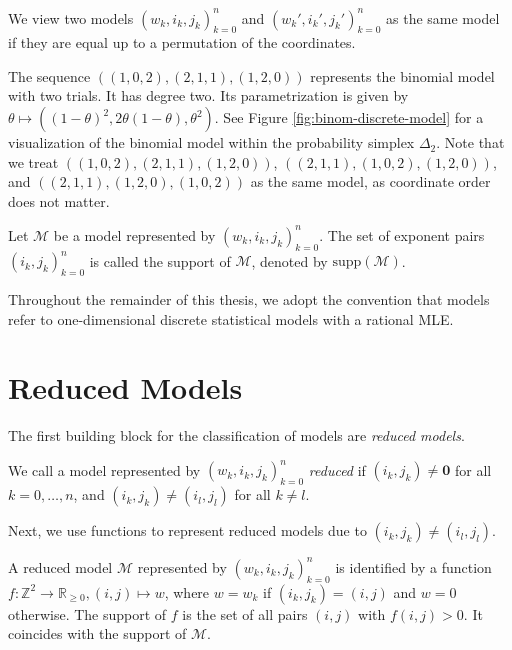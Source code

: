 \begin{remark}\label{rem:equivalent-models}
    We view two models \( (w_k,i_k,j_k)_{k=0}^n \) and \( (w_k',i_k',j_k')_{k=0}^n \) as the same model if they are equal up to a permutation of the coordinates.
\end{remark}

\begin{example}
    The sequence \( ((1,0,2), (2,1,1), (1,2,0)) \) represents the binomial model with two trials. It has degree two. Its parametrization is given by \( \theta \mapsto ((1-\theta)^2, 2\theta(1-\theta),\theta^2) \). See Figure \ref{fig:binom-discrete-model} for a visualization of the binomial model within the probability simplex \( \Delta_2 \). Note that we treat \( ((1,0,2), (2,1,1), (1,2,0)) \), \( ((2,1,1), (1,0,2), (1,2,0)) \), and \( ((2,1,1), (1,2,0), (1,0,2)) \) as the same model, as coordinate order does not matter.
\end{example}

\begin{definition}
    Let \( \mathcal{M} \) be a model represented by \( (w_k, i_k, j_k)_{k=0}^n \). The set of exponent pairs \( (i_k, j_k)_{k=0}^n \) is called the support of \( \mathcal{M} \), denoted by \( \mathrm{supp}(\mathcal{M}) \).
\end{definition}

Throughout the remainder of this thesis, we adopt the convention that models refer to one-dimensional discrete statistical models with a rational MLE.


\section{Reduced Models}

The first building block for the classification of models are \emph{reduced models}.


\begin{definition}
    We call a model represented by \( (w_k, i_k, j_k)_{k=0}^n \) \emph{reduced} if \( (i_k, j_k) \neq \mathbf 0 \) for all \( k = 0, \dots, n \), and \( (i_k, j_k) \neq (i_l, j_l) \) for all \( k \neq l \).
\end{definition}

Next, we use functions to represent reduced models due to \( (i_k, j_k) \neq (i_l, j_l) \).

\begin{remark}\label{rem:representation-of-models-by-functions}
    A reduced model \( \mathcal{M} \) represented by \( (w_k, i_k, j_k)_{k=0}^n \) is identified by a function \( f: \mathbb{Z}^2 \to \mathbb{R}_{\geq 0}, (i, j) \mapsto w \), where \( w = w_k \) if \( (i_k, j_k) = (i, j) \) and \( w = 0 \) otherwise. The support of \( f \) is the set of all pairs \( (i, j) \) with \( f(i, j) > 0 \). It coincides with the support of \( \mathcal{M} \).
\end{remark}


